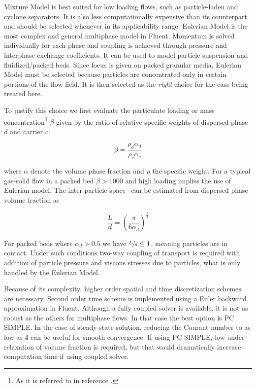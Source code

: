 Mixture Model is best suited for low loading flows, such as particle-laden and cyclone separators. It is also less computationally expensive than its counterpart and should be selected whenever in its applicability range. Eulerian Model is the most complex and general multiphase model in Fluent. Momentum is solved individually for each phase and coupling is achieved through pressure and interphase exchange coefficients. It can be used to model particle suspension and fluidized/packed beds. Since focus is given on packed granular media, Eulerian Model must be selected because particles are concentrated only in certain portions of the flow field. It is then selected as the \emph{right} choice for the case being treated here.

To justify this choice we first evaluate the particulate loading or mass concentration\footnote{As it is referred to in reference \cite{Crowe2011}.} $\beta$ given by the ratio of relative specific weights of dispersed phase $d$ and carrier $c$: 

\begin{equation}
\beta=\frac{\rho_{d}\alpha_{d}}{\rho_{c}\alpha_{c}}
\end{equation}

\noindent{}where $\alpha$ denote the volume phase fraction and $\rho$ the specific weight. For a typical gas-solid flow in a packed bed $\beta>1000$ and high loading implies the use of Eulerian model. The inter-particle space~\cite{Crowe2011} can be estimated from dispersed phase volume fraction as

\begin{equation}
\frac{L}{d}=\left(\frac{\pi}{6\alpha_{d}}\right)^{\frac{1}{3}}
\end{equation}

For packed beds where $\alpha_{d}>0.5$ we have $\sfrac{L}{d}\le{}1$, meaning particles are in contact. Under such conditions two-way coupling of transport is required with addition of particle pressure and viscous stresses due to particles, what is only handled by the Eulerian Model.

Because of its complexity, higher order spatial and time discretization schemes are necessary. Second order time scheme is implemented using a Euler backward approximation in Fluent. Although a fully coupled solver is available, it is not as robust as the others for multiphase flows. In that case the best option is PC SIMPLE. In the case of steady-state solution, reducing the Courant number to as low as 4 can be useful for smooth convergence. If using PC SIMPLE, low under-relaxation of volume fraction is required, but that would dramatically increase computation time if using coupled solver.

